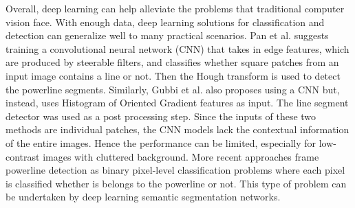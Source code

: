 \documentclass[journal]{IEEEtran}
\begin{document}
Overall, deep learning can help alleviate the problems that traditional computer vision face. With enough data, deep learning solutions for classification and detection can generalize well to many practical scenarios. Pan et al. \cite{related_work_chaofeng_pan_2016} suggests training a convolutional neural network (CNN) that takes in edge features, which are produced by steerable filters, and classifies whether square patches from an input image contains a line or not. Then the Hough transform is used to detect the powerline segments. Similarly, Gubbi et al. \cite{related_work_jayavardhana_gubbi} also proposes using a CNN but, instead, uses Histogram of Oriented Gradient features as input. The line segment detector \cite{lsd} was used as a post processing step. Since the inputs of these two methods are individual patches, the CNN models lack the contextual information of the entire images. Hence the performance can be limited, especially for low-contrast images with cluttered background. More recent approaches \cite{related_work_rainesh_mandaan_2017,related_work_heng_zhang_2019,related_work_yan_li_2019,related_work_omer_emre_yetgin_2018,related_work_rabab_abdelfattah_2022,related_work_rabeea_haffari_2021} frame powerline detection as binary pixel-level classification problems where each pixel is classified whether is belongs to the powerline or not. This type of problem can be undertaken by deep learning semantic segmentation networks. 
\end{document}
